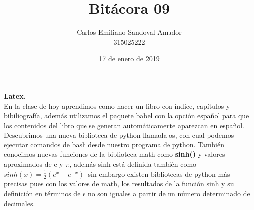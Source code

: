 \documentclass[letterpaper, 12pt, oneside]{article}%
\title{Bitácora 09}
\author{Carlos Emiliano Sandoval Amador \\ 315025222}
\date{17 de enero de 2019}
\begin{document}
	\maketitle
	\textbf{\Large Latex.} \\ En la clase de hoy aprendimos como hacer un libro con índice, capítulos y bibiliografía, además utilizamos el paquete babel con la opción español para que los contenidos del libro que se generan automáticamente aparezcan en español. \\ Descubrimos una nueva biblioteca de python llamada os, con cual podemos ejecutar comandos de bash desde nuestro programa de python. También conocimos nuevas funciones de la biblioteca math como \textbf{sinh()} y valores aproximados de e y $\pi$, además sinh está definida también como $sinh(x) = \frac{1}{2}(e^{x}-e^{-x})$, sin embargo existen bibliotecas de python más precisas pues con los valores de math, los resultados de la función sinh y su definición en términos de e no son iguales a partir de un número determinado de decimales.
\end{document}
